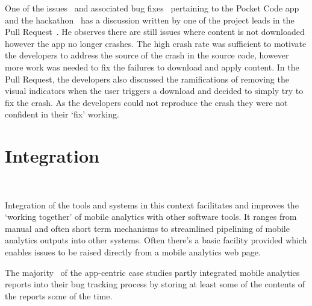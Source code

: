 One of the issues~ and associated bug fixes~ pertaining to the Pocket Code app and the hackathon~ has a discussion written by one of the project leads in the Pull Request~. 
He observes there are still issues where content is not downloaded however the app no longer crashes. The high crash rate was sufficient to motivate the developers to address the source of the crash in the source code, however more work was needed to fix the failures to download and apply content. In the Pull Request, the developers also discussed the ramifications of removing the visual indicators when the user triggers a download and decided to simply try to fix the crash. As the developers could not reproduce the crash they were not confident in their `fix' working.

\section{Integration}~\label{aiu-integration-section}

Integration of the tools and systems in this context facilitates and improves the `working together' of mobile analytics with other software tools. It ranges from manual and often short term mechanisms to streamlined pipelining of mobile analytics outputs into other systems. Often there's a basic facility provided which enables issues to be raised directly from a mobile analytics web page.

The majority~ of the app-centric case studies partly integrated mobile analytics reports into their bug tracking process by storing at least some of the contents of the reports some of the time.  

